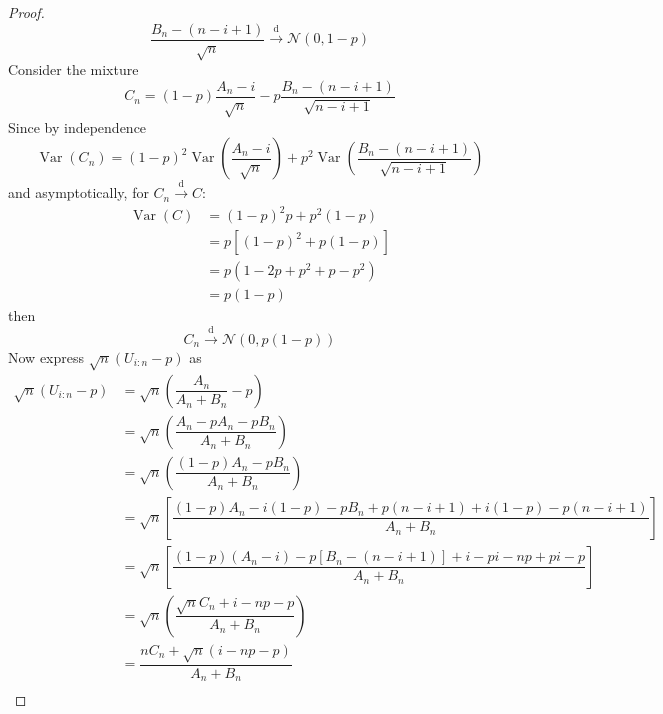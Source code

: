 \documentclass[11pt]{report} %
\begin{document}
\begin{proof}
\begin{equation}
\dfrac{B_{n} - \left(n - i + 1\right)}{\sqrt{n}} \overset{\mathrm{d}}{\to} \mathcal{N}\left(0, 1 - p\right)
\end{equation}
Consider the mixture
\begin{equation}
C_{n} = \left(1 - p\right)\dfrac{A_{n} - i}{\sqrt{n}} - p\dfrac{B_{n} - \left(n - i + 1\right)}{\sqrt{n - i + 1}}
\end{equation}
Since by independence
\begin{equation}
\operatorname{Var}\left(C_{n}\right) = \left(1 - p\right)^{2}\operatorname{Var}\left(\dfrac{A_{n} - i}{\sqrt{n}}\right) + p^{2}\operatorname{Var}\left(\dfrac{B_{n} - \left(n - i + 1\right)}{\sqrt{n - i + 1}}\right)
\end{equation}
and asymptotically, for $C_{n} \overset{\mathrm{d}}{\to} C$:
\begin{align}
\operatorname{Var}\left(C\right) &= \left(1 - p\right)^{2}p + p^{2}\left(1 - p\right) \\
&= p\left[\left(1 - p\right)^{2} + p\left(1 - p\right)\right] \\
&= p\left(1 - 2p + p^{2} + p - p^{2}\right) \\
&= p\left(1 - p\right)
\end{align}
then
\begin{equation}
C_{n} \overset{\mathrm{d}}{\to} \mathcal{N}\left(0, p\left(1 - p\right)\right)
\end{equation}
Now express $\sqrt{n}\left(U_{i:n} - p\right)$ as
\begin{align}
\sqrt{n}\left(U_{i:n} - p\right) &= \sqrt{n}\left(\dfrac{A_{n}}{A_{n} + B_{n}} - p\right) \\
&= \sqrt{n}\left(\dfrac{A_{n} - pA_{n} - pB_{n}}{A_{n} + B_{n}}\right) \\
&= \sqrt{n}\left(\dfrac{\left(1 - p\right)A_{n} - pB_{n}}{A_{n} + B_{n}}\right) \\
&= \sqrt{n}\left[\dfrac{\left(1 - p\right)A_{n} - i\left(1 - p\right) - pB_{n} + p\left(n - i + 1\right) + i\left(1 - p\right) - p\left(n - i + 1\right)}{A_{n} + B_{n}}\right] \\
&= \sqrt{n}\left[\dfrac{\left(1 - p\right)\left(A_{n} - i\right) - p\left[B_{n} - \left(n - i + 1\right)\right] + i - pi - np + pi - p}{A_{n} + B_{n}}\right] \\
&= \sqrt{n}\left(\dfrac{\sqrt{n}C_{n} + i - np - p}{A_{n} + B_{n}}\right) \\
&= \dfrac{nC_{n} + \sqrt{n}\left(i - np - p\right)}{A_{n} + B_{n}} \\

\end{align}
\end{proof}
\end{document}
